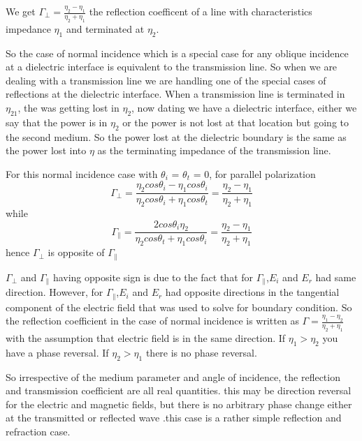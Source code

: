 We get $\Gamma_{\perp} = \frac{\eta_{2} - \eta_{1}}{\eta_{2} + \eta_{1}}$ the reflection coefficent of a line with characteristics impedance  $\eta_{1}$ and terminated at  $\eta_{2}$.

So the case of normal incidence which is a special case for any oblique incidence at a dielectric interface is equivalent to the transmission line. So when we are dealing with a transmission line we are handling one of the special cases of reflections at the dielectric interface. When a transmission line is terminated in  $\eta_{21}$, the was getting lost in  $\eta_{2}$, now dating we have a dielectric interface,  either we say that the power is in  $\eta_{2}$ or the power is not lost at that location but going to the second medium. So the power lost at the dielectric boundary is the same as the power lost into  $\eta$ as the terminating impedance of the transmission line. 

For this normal incidence case with $\theta_{i}$ = $\theta_{t}$ = 0, for parallel polarization
\begin{dmath*}
\Gamma_{\perp} = \frac{\eta_{2} cos\theta_{i} - \eta_{1} cos\theta_{i}}{\eta_{2} cos\theta_{i} + \eta_{1} cos\theta_{t}}
= \frac{\eta_{2} - \eta_{1}}{\eta_{2} + \eta_{1}}
\end{dmath*}
while
\begin{dmath*}
\Gamma_{\parallel} = \frac{2 cos\theta_{i} \eta_{2}}{\eta_{2} cos\theta_{t} + \eta_{1} cos\theta_{i}} 
= \frac{\eta_{2} -\eta_{1}}{\eta_{2} +\eta_{1}}
\end{dmath*}
hence $\Gamma_{\perp}$ is opposite of $\Gamma_{\parallel}$

$\Gamma_{\perp}$ and $\Gamma_{\parallel}$ having opposite sign is due to the fact that for  $\Gamma_{\parallel}$,$E_{i}$ and $E_{r}$ had same direction. However, for  $\Gamma_{\parallel}$,$E_{i}$ and $E_{r}$ had opposite directions in the tangential component of the electric field that was used to solve for boundary condition. So the reflection coefficient in the case of normal incidence is written as $\Gamma = \frac{\eta_{1} - \eta_{2}}{\eta_{2} + \eta_{1}}$  with the assumption that electric field is in the same direction. If $\eta_{1}>\eta_{2}$ you have a phase reversal. If $\eta_{2}>\eta_{1}$ there is no phase reversal. 

So irrespective of the medium parameter and angle of incidence, the reflection and transmission coefficient are all real quantities. this may be direction reversal for the electric and magnetic fields,  but there is no arbitrary phase change either at the transmitted or reflected wave  .this case is a rather simple reflection and refraction case. 